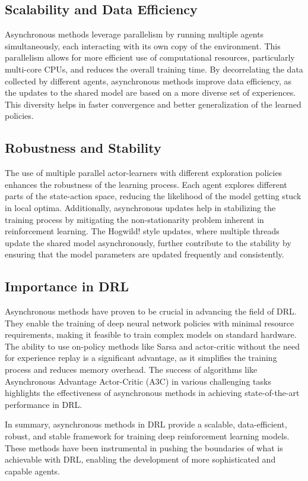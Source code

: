 \documentclass{article}
\begin{document}
\subsection{Scalability and Data Efficiency}
Asynchronous methods leverage parallelism by running multiple agents simultaneously, each interacting with its own copy of the environment. This parallelism allows for more efficient use of computational resources, particularly multi-core CPUs, and reduces the overall training time. By decorrelating the data collected by different agents, asynchronous methods improve data efficiency, as the updates to the shared model are based on a more diverse set of experiences. This diversity helps in faster convergence and better generalization of the learned policies.

\subsection{Robustness and Stability}
The use of multiple parallel actor-learners with different exploration policies enhances the robustness of the learning process. Each agent explores different parts of the state-action space, reducing the likelihood of the model getting stuck in local optima. Additionally, asynchronous updates help in stabilizing the training process by mitigating the non-stationarity problem inherent in reinforcement learning. The Hogwild! style updates, where multiple threads update the shared model asynchronously, further contribute to the stability by ensuring that the model parameters are updated frequently and consistently.

\subsection{Importance in DRL}
Asynchronous methods have proven to be crucial in advancing the field of DRL. They enable the training of deep neural network policies with minimal resource requirements, making it feasible to train complex models on standard hardware. The ability to use on-policy methods like Sarsa and actor-critic without the need for experience replay is a significant advantage, as it simplifies the training process and reduces memory overhead. The success of algorithms like Asynchronous Advantage Actor-Critic (A3C) in various challenging tasks highlights the effectiveness of asynchronous methods in achieving state-of-the-art performance in DRL.

In summary, asynchronous methods in DRL provide a scalable, data-efficient, robust, and stable framework for training deep reinforcement learning models. These methods have been instrumental in pushing the boundaries of what is achievable with DRL, enabling the development of more sophisticated and capable agents.
\end{document}
